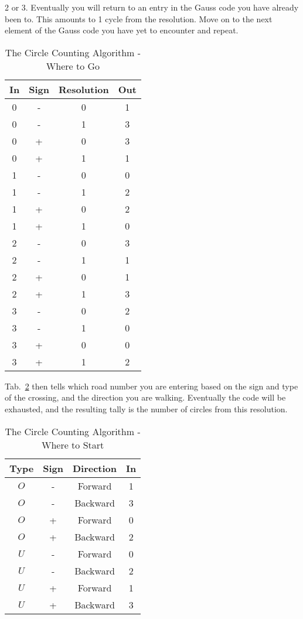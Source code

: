         2 or 3. Eventually you will return to an entry in
        the Gauss code you have already been to. This amounts to 1 cycle from
        the resolution. Move on to the next element of the Gauss code you have
        yet to encounter and repeat.
        \begin{table}
            \centering
            \begin{tabular}{c c c c}
                In&Sign&Resolution&Out\\
                \hline
                0&-&0&1\\
                0&-&1&3\\
                0&+&0&3\\
                0&+&1&1\\
                \hline
                1&-&0&0\\
                1&-&1&2\\
                1&+&0&2\\
                1&+&1&0\\
                \hline
                2&-&0&3\\
                2&-&1&1\\
                2&+&0&1\\
                2&+&1&3\\
                \hline
                3&-&0&2\\
                3&-&1&0\\
                3&+&0&0\\
                3&+&1&2
            \end{tabular}
            \caption{The Circle Counting Algorithm - Where to Go}
            \label{tab:circle_counting_algorithm_where_go}
        \end{table}
        Tab.~\ref{tab:circle_counting_algorithm_where_start}
        then tells which road number you are entering based on the sign and type
        of the crossing, and the direction you are walking. Eventually the code
        will be exhausted, and the resulting tally is the number of
        circles from this resolution.
        \par\hfill\par
        \begin{table}
            \centering
            \begin{tabular}{c c c c}
                Type&Sign&Direction&In\\
                \hline
                $O$&-&Forward&1\\
                $O$&-&Backward&3\\
                $O$&+&Forward&0\\
                $O$&+&Backward&2\\
                \hline
                $U$&-&Forward&0\\
                $U$&-&Backward&2\\
                $U$&+&Forward&1\\
                $U$&+&Backward&3
            \end{tabular}
            \caption{The Circle Counting Algorithm - Where to Start}
            \label{tab:circle_counting_algorithm_where_start}
        \end{table}
